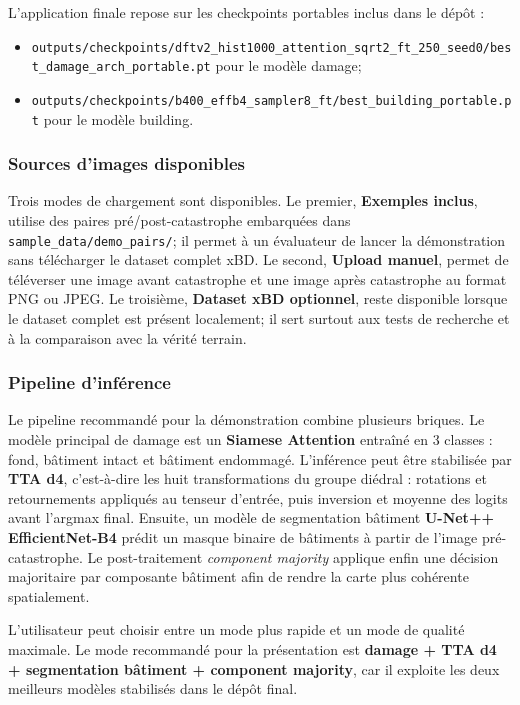 \documentclass[french,12pt]{article}
\begin{document}
L'application finale repose sur les checkpoints portables inclus dans le dépôt :
\begin{itemize}
    \item \texttt{outputs/checkpoints/dftv2\_hist1000\_attention\_sqrt2\_ft\_250\_seed0/best\_damage\_arch\_portable.pt} pour le modèle damage;
    \item \texttt{outputs/checkpoints/b400\_effb4\_sampler8\_ft/best\_building\_portable.pt} pour le modèle building.
\end{itemize}

\subsubsection{Sources d'images disponibles}

Trois modes de chargement sont disponibles. Le premier, \textbf{Exemples inclus}, utilise des paires pré/post-catastrophe embarquées dans \texttt{sample\_data/demo\_pairs/}; il permet à un évaluateur de lancer la démonstration sans télécharger le dataset complet xBD. Le second, \textbf{Upload manuel}, permet de téléverser une image avant catastrophe et une image après catastrophe au format PNG ou JPEG. Le troisième, \textbf{Dataset xBD optionnel}, reste disponible lorsque le dataset complet est présent localement; il sert surtout aux tests de recherche et à la comparaison avec la vérité terrain.

\subsubsection{Pipeline d'inférence}
\label{subsec:tta}

Le pipeline recommandé pour la démonstration combine plusieurs briques. Le modèle principal de damage est un \textbf{Siamese Attention} entraîné en 3 classes : fond, bâtiment intact et bâtiment endommagé. L'inférence peut être stabilisée par \textbf{TTA d4}, c'est-à-dire les huit transformations du groupe diédral : rotations et retournements appliqués au tenseur d'entrée, puis inversion et moyenne des logits avant l'argmax final. Ensuite, un modèle de segmentation bâtiment \textbf{U-Net++ EfficientNet-B4} prédit un masque binaire de bâtiments à partir de l'image pré-catastrophe. Le post-traitement \textit{component majority} applique enfin une décision majoritaire par composante bâtiment afin de rendre la carte plus cohérente spatialement.

L'utilisateur peut choisir entre un mode plus rapide et un mode de qualité maximale. Le mode recommandé pour la présentation est \textbf{damage + TTA d4 + segmentation bâtiment + component majority}, car il exploite les deux meilleurs modèles stabilisés dans le dépôt final.
\end{document}
